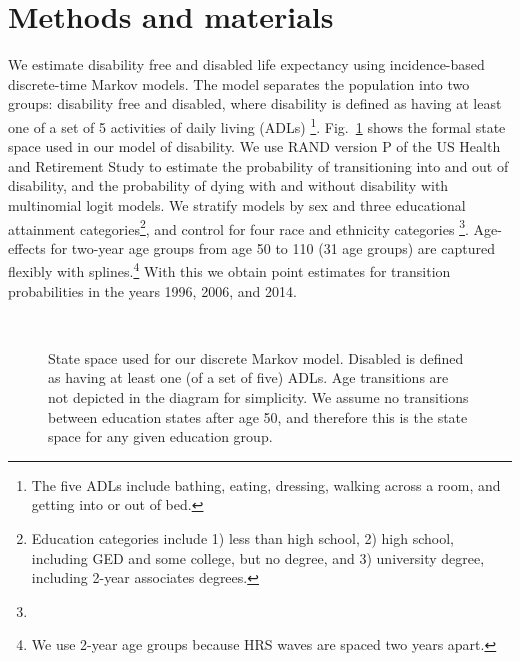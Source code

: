 \section{Methods and materials}
\label{sec:methods}
We estimate disability free and disabled life expectancy using incidence-based discrete-time Markov models. The model separates the population into two groups: disability free and disabled, where disability is defined as having at least one of a set of 5 activities of daily living (ADLs) \footnote{The five ADLs include bathing, eating, dressing, walking across a room, and getting into or out of bed.}. Fig.~\ref{fig:statespace} shows the formal state space used in our model of disability. We use RAND version P of the US Health and Retirement Study \citep{RAND, HRS} to estimate the probability of transitioning into and out of disability, and the probability of dying with and without disability with multinomial logit models. We stratify models by sex and three educational attainment categories\footnote{Education categories include 1) less than high school, 2) high school, including GED and some college, but no degree, and 3) university degree, including 2-year associates degrees.}, and control for four race and ethnicity categories \footnote{}. Age-effects for two-year age groups from age 50 to 110 (31 age groups) are captured flexibly with splines.\footnote{We use 2-year age groups because HRS waves are spaced two years apart.} With this we obtain point estimates for transition probabilities in the years 1996, 2006, and 2014. 

\begin{figure}[ht!]\centering
{}\\

\caption{State space used for our discrete Markov model. Disabled is defined as having at least one (of a set of five) ADLs. Age transitions are not depicted in the diagram for simplicity. We assume no transitions between education states after age 50, and therefore this is the state space for any given education group.}\label{fig:statespace}
\end{figure}

